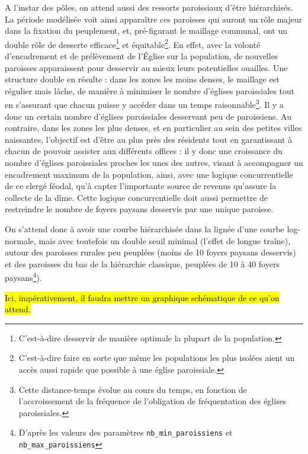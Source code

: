 A l'instar des pôles, on attend aussi des ressorts paroissiaux d'être hiérarchisés.
La période modélisée voit ainsi apparaître ces paroisses qui auront un rôle majeur dans la fixation du peuplement, et, pré-figurant le maillage communal, ont un double rôle de desserte efficace\footnote{C'est-à-dire desservir de manière optimale la plupart de la population.} et équitable\footnote{C'est-à-dire faire en sorte que même les populations les plus isolées aient un accès aussi rapide que possible à une église paroissiale.}.
En effet, avec la volonté d'encadrement et de prélèvement de l'Église sur la population, de nouvelles paroisses apparaissent pour desservir au mieux leurs potentielles ouailles.
Une structure double en résulte :
dans les zones les moins denses, le maillage est régulier mais lâche, de manière à minimiser le nombre d'églises paroissiales tout en s'assurant que chacun puisse y accéder dans un temps raisonnable\footnote{Cette distance-temps évolue au cours du temps, en fonction de l'accroissement de la fréquence de l'obligation de fréquentation des églises paroissiales.}.
Il y a donc un certain nombre d'églises paroissiales desservant peu de paroissiens.
Au contraire, dans les zones les plus denses, et en particulier au sein des petites villes naissantes, l'objectif est d'être au plus près des résidents tout en garantissant à chacun de pouvoir assister aux différents offices :
il y donc une croissance du nombre d'églises paroissiales proches les unes des autres, visant à accompagner un encadrement maximum de la population, ainsi, avec une logique concurrentielle de ce clergé féodal, qu'à capter l'importante source de revenus qu'assure la collecte de la dîme.
Cette logique concurrentielle doit aussi permettre de restreindre le nombre de foyers paysans desservis par une unique paroisse.

On s'attend donc à avoir une courbe hiérarchisée dans la lignée d'une courbe log-normale, mais avec toutefois un double seuil minimal (l'effet de \og longue traîne\fg{}), autour des paroisses \og rurales\fg{} peu peuplées (moins de 10 foyers paysans desservis) et des paroisses du bas de la hiérarchie classique, peuplées de 10 à 40 foyers paysans\footnote{D'après les valeurs des paramètres \texttt{nb\_min\_paroissiens} et \texttt{nb\_max\_paroissiens}}).

\begin{center}
\hl{Ici, impérativement, il faudra mettre un graphique schématique de ce qu'on attend.}
\end{center}

